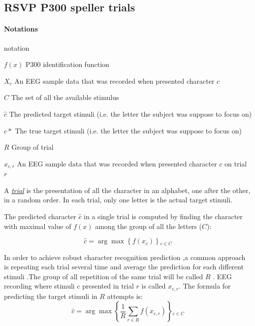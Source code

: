 \documentclass[
12pt, %
english, %
doublespacing, %
headsepline, %
]{MastersDoctoralThesis} %
\begin{document}
\subsection{RSVP P300 speller trials}

\paragraph{Notations}
\begin{labeling}{notation}
	\item [$f(x)$] P300 identification function
	\item [$X_c$] An EEG sample data that was recorded when presented character $c$
	\item [$C$] The set of all the available stimulus 
	\item [$\hat{c}$] The predicted target stimuli (i.e. the letter the subject was suppose to focus on)
	\item [$c*$] The true target stimuli (i.e. the letter the subject was suppose to focus on)	
	\item [$R$] Group of trial
	\item [$x_{c,r}$] An EEG sample data that was recorded when presented character $c$ on trial $r$
\end{labeling}

A \underline{\textit{trial}} is the presentation of all the character in an alphabet, one after the other, in a random order. In each trial, only one letter is the actual target stimuli.  

The predicted character $\hat{c}$ in a single trial is computed by finding the character with maximal value of $f(x)$ among the group of all the letters ($C$):


\begin{equation}
\hat{c} = \arg \max \left\{ {f\left( {{x_{c}}} \right)} \right\}{  _{c \in C}}
\end{equation}

In order to achieve robust character recognition prediction ,a common approach is repeating each trial several time and average the prediction for each different stimuli .The group of all repetition of the same trial will be called $R$ . EEG recording where stimuli $c$ presented in trial $r$ is called $x_{c,r}$. The formula for predicting the target stimuli in $R$ attempts is:
\begin{equation}
\hat c = \arg \max \left\{ {\frac{1}{R}\sum\limits_{r \in R}^{} {f\left( {{x_{c,r}}} \right)} } \right\}{_{c \in C}}
\end{equation}
\end{document}
